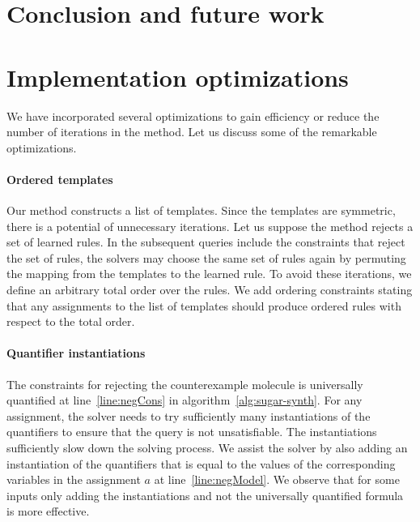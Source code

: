 \documentclass{llncs}
\begin{document}
% 

\section{Conclusion and future work}
\label{sec:conclusion}





\appendix

\section{Implementation optimizations}

We have incorporated several optimizations to gain efficiency or reduce
the number of iterations in the method. Let us discuss some of the remarkable
optimizations.

\paragraph{Ordered templates}
Our method constructs a list of templates.
Since the templates are symmetric, there is a potential of unnecessary
iterations.
Let us suppose the method rejects a set of learned rules.
In the subsequent queries include the constraints that reject the set of rules,
the solvers may choose the same set of rules again by permuting the mapping
from the templates to the learned rule.
To avoid these iterations, we define an arbitrary total order over the rules.
We add ordering constraints stating that any assignments to the list of templates should produce
ordered rules with respect to the total order.

\paragraph{Quantifier instantiations}
The constraints for rejecting the counterexample molecule is universally quantified at line~\ref{line:negCons} in algorithm~\ref{alg:sugar-synth}.
For any assignment, the solver needs to try sufficiently many instantiations of the quantifiers
to ensure that the query is not unsatisfiable.
The instantiations sufficiently slow down the solving process.
We assist the solver by also adding an instantiation of the quantifiers that is equal
to the values of the corresponding variables in the assignment $a$ at line~\ref{line:negModel}.
We observe that for some inputs only adding the instantiations and not the universally quantified
formula is more effective.
\end{document}
